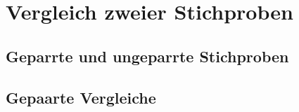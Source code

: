 \chapter{Vergleich zweier Stichproben}
\label{kap11}
\section{Geparrte und ungeparrte Stichproben}
\section{Gepaarte Vergleiche}
\label{sec11.2}
